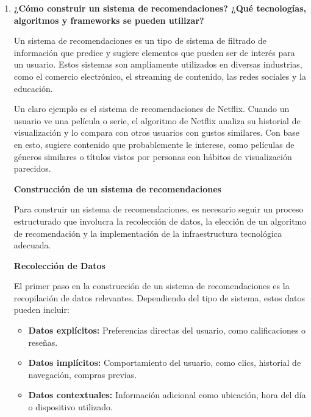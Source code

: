 \documentclass[14pt]{extarticle}
\begin{document}
  \begin{enumerate}
    \item \textbf{¿Cómo construir un sistema de recomendaciones? ¿Qué tecnologías, algoritmos y frameworks se pueden utilizar?}

    \vspace{0.3cm}
    Un sistema de recomendaciones es un tipo de sistema de filtrado de información que predice y sugiere elementos que pueden ser de interés para un usuario. Estos sistemas son ampliamente utilizados en diversas industrias, como el comercio electrónico, el streaming de contenido, las redes sociales y la educación.

    Un claro ejemplo es el sistema de recomendaciones de Netflix. Cuando un usuario ve una película o serie, el algoritmo de Netflix analiza su historial de visualización y lo compara con otros usuarios con gustos similares. Con base en esto, sugiere contenido que probablemente le interese, como películas de géneros similares o títulos vistos por personas con hábitos de visualización parecidos.

    \vspace{0.3cm}
    \textbf{Construcción de un sistema de recomendaciones}

    Para construir un sistema de recomendaciones, es necesario seguir un proceso estructurado que involucra la recolección de datos, la elección de un algoritmo de recomendación y la implementación de la infraestructura tecnológica adecuada.

    \vspace{0.3cm}
    \textbf{Recolección de Datos}

    El primer paso en la construcción de un sistema de recomendaciones es la recopilación de datos relevantes. Dependiendo del tipo de sistema, estos datos pueden incluir:

    \begin{itemize}
      \item \textbf{Datos explícitos:} Preferencias directas del usuario, como calificaciones o reseñas.

      \item \textbf{Datos implícitos:} Comportamiento del usuario, como clics, historial de navegación, compras previas.

      \item \textbf{Datos contextuales:} Información adicional como ubicación, hora del día o dispositivo utilizado.
    \end{itemize}


\end{enumerate}
\end{document}
